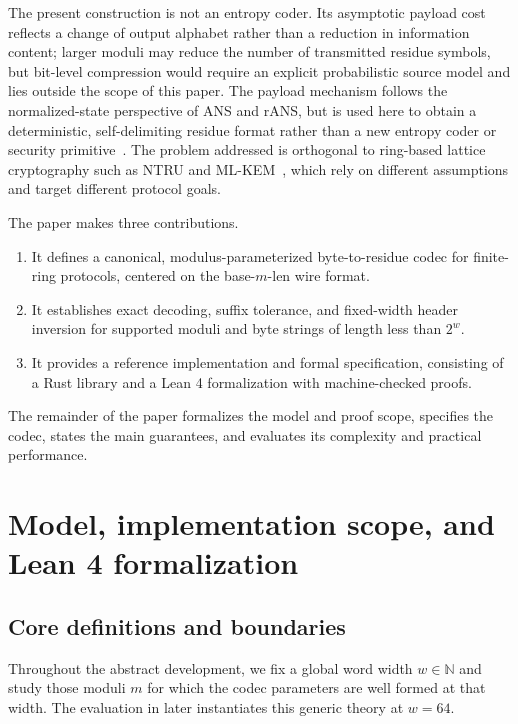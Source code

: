 \documentclass{system-security-article}
\newcommand{\BaseM}{base-\(m\)}
\newcommand{\BaseMLen}{\BaseM{}-len}
\begin{document}
    The present construction is not an entropy coder.
    Its asymptotic payload cost reflects a change of output alphabet rather than a reduction in information content;
    larger moduli may reduce the number of transmitted residue symbols, but bit-level compression would require an
    explicit probabilistic source model and lies outside the scope of this paper.
    The payload mechanism follows the normalized-state perspective of ANS and rANS, but is used here to
    obtain a deterministic, self-delimiting residue format rather than a new entropy coder or security primitive~\cite{duda2013ans,giesen2014rans}.
    The problem addressed is orthogonal to ring-based lattice cryptography such as
    NTRU and ML-KEM~\cite{ntru1998,nist2024post}, which rely on different assumptions and target different protocol goals.

    The paper makes three contributions.
    \begin{enumerate}
        \item It defines a canonical, modulus-parameterized byte-to-residue codec for finite-ring protocols,
        centered on the \BaseMLen{} wire format.
        \item It establishes exact decoding, suffix tolerance, and fixed-width header inversion for supported
        moduli and byte strings of length less than \(2^{w}\).
        \item It provides a reference implementation and formal specification, consisting of a
        Rust library and a Lean 4 formalization with machine-checked proofs.
    \end{enumerate}

    The remainder of the paper formalizes the model and proof scope, specifies the codec, states the
    main guarantees, and evaluates its complexity and practical performance.

    \section{Model, implementation scope, and Lean 4 formalization}
    \label{sec:model}

    \subsection{Core definitions and boundaries}
    \label{subsec:assumptions}

    Throughout the abstract development, we fix a global word width \(w \in \mathbb{N}\) and study those moduli \(m\)
    for which the codec parameters are well formed at that width.
    The evaluation in  later instantiates this generic theory at \(w=64\).
\end{document}
